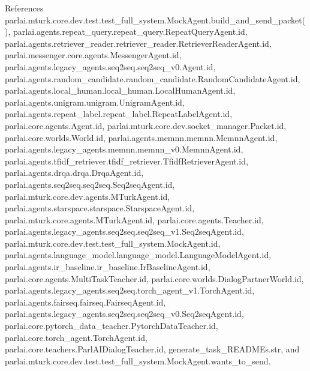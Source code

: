 References parlai.\+mturk.\+core.\+dev.\+test.\+test\+\_\+full\+\_\+system.\+Mock\+Agent.\+build\+\_\+and\+\_\+send\+\_\+packet(), parlai.\+agents.\+repeat\+\_\+query.\+repeat\+\_\+query.\+Repeat\+Query\+Agent.\+id, parlai.\+agents.\+retriever\+\_\+reader.\+retriever\+\_\+reader.\+Retriever\+Reader\+Agent.\+id, parlai.\+messenger.\+core.\+agents.\+Messenger\+Agent.\+id, parlai.\+agents.\+legacy\+\_\+agents.\+seq2seq.\+seq2seq\+\_\+v0.\+Agent.\+id, parlai.\+agents.\+random\+\_\+candidate.\+random\+\_\+candidate.\+Random\+Candidate\+Agent.\+id, parlai.\+agents.\+local\+\_\+human.\+local\+\_\+human.\+Local\+Human\+Agent.\+id, parlai.\+agents.\+unigram.\+unigram.\+Unigram\+Agent.\+id, parlai.\+agents.\+repeat\+\_\+label.\+repeat\+\_\+label.\+Repeat\+Label\+Agent.\+id, parlai.\+core.\+agents.\+Agent.\+id, parlai.\+mturk.\+core.\+dev.\+socket\+\_\+manager.\+Packet.\+id, parlai.\+core.\+worlds.\+World.\+id, parlai.\+agents.\+memnn.\+memnn.\+Memnn\+Agent.\+id, parlai.\+agents.\+legacy\+\_\+agents.\+memnn.\+memnn\+\_\+v0.\+Memnn\+Agent.\+id, parlai.\+agents.\+tfidf\+\_\+retriever.\+tfidf\+\_\+retriever.\+Tfidf\+Retriever\+Agent.\+id, parlai.\+agents.\+drqa.\+drqa.\+Drqa\+Agent.\+id, parlai.\+agents.\+seq2seq.\+seq2seq.\+Seq2seq\+Agent.\+id, parlai.\+mturk.\+core.\+dev.\+agents.\+M\+Turk\+Agent.\+id, parlai.\+agents.\+starspace.\+starspace.\+Starspace\+Agent.\+id, parlai.\+mturk.\+core.\+agents.\+M\+Turk\+Agent.\+id, parlai.\+core.\+agents.\+Teacher.\+id, parlai.\+agents.\+legacy\+\_\+agents.\+seq2seq.\+seq2seq\+\_\+v1.\+Seq2seq\+Agent.\+id, parlai.\+mturk.\+core.\+dev.\+test.\+test\+\_\+full\+\_\+system.\+Mock\+Agent.\+id, parlai.\+agents.\+language\+\_\+model.\+language\+\_\+model.\+Language\+Model\+Agent.\+id, parlai.\+agents.\+ir\+\_\+baseline.\+ir\+\_\+baseline.\+Ir\+Baseline\+Agent.\+id, parlai.\+core.\+agents.\+Multi\+Task\+Teacher.\+id, parlai.\+core.\+worlds.\+Dialog\+Partner\+World.\+id, parlai.\+agents.\+legacy\+\_\+agents.\+seq2seq.\+torch\+\_\+agent\+\_\+v1.\+Torch\+Agent.\+id, parlai.\+agents.\+fairseq.\+fairseq.\+Fairseq\+Agent.\+id, parlai.\+agents.\+legacy\+\_\+agents.\+seq2seq.\+seq2seq\+\_\+v0.\+Seq2seq\+Agent.\+id, parlai.\+core.\+pytorch\+\_\+data\+\_\+teacher.\+Pytorch\+Data\+Teacher.\+id, parlai.\+core.\+torch\+\_\+agent.\+Torch\+Agent.\+id, parlai.\+core.\+teachers.\+Parl\+A\+I\+Dialog\+Teacher.\+id, generate\+\_\+task\+\_\+\+R\+E\+A\+D\+M\+Es.\+str, and parlai.\+mturk.\+core.\+dev.\+test.\+test\+\_\+full\+\_\+system.\+Mock\+Agent.\+wants\+\_\+to\+\_\+send.


